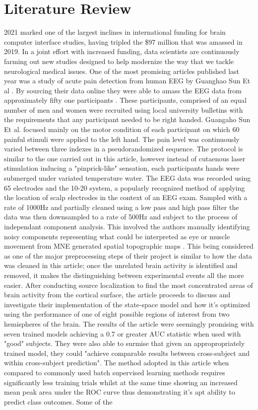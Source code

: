 \documentclass[11pt]{article}
\begin{document}
\section{Literature Review}

2021 marked one of the largest inclines in international funding for brain computer interface studies, having tripled the \$97 million that was amassed in 2019. In a joint effort with increased funding, data scientists are continuously farming out new studies designed to help modernize the way that we tackle neurological medical issues. One of the most promising articles published last year was a study of acute pain detection from human EEG by Guanghao Sun Et al \cite{SUN2021108964}. By sourcing their data online they were able to amass the EEG data from approximately fifty one participants \cite{Tiemann2018-sm}. These participants, comprised of an equal number of men and women were recruited using local university bulletins with the requirements that any participant needed to be right handed. Guangaho Sun Et al. focused mainly on the motor condition of each participant on which 60 painful stimuli were applied to the left hand. The pain level was continuously varied between three indexes in a pseudorandomized sequence. The protocol is similar to the one carried out in this article, however instead of cutaenous laser stimulation inducing a "pinprick-like" sensation, each participants hands were submerged under variated temperature water. The EEG data was recorded using 65 electrodes and the 10-20 system, a popularly recognized method of applying the location of scalp electrodes in the context of an EEG exam. Sampled with a rate of 1000Hz and partially cleaned using a low pass and high pass filter the data was then downsampled to a rate of 500Hz and subject to the process of independant component analysis. This involved the authors manually identifying noisy components representing what could be interpreted as eye or muscle movement from MNE generated spatial topographic maps \cite{GramfortEtAl2013a}. This being considered as one of the major preprocessing steps of their project is similar to how the data was cleaned in this article; once the unrelated brain activity is identified and removed, it makes the distinguishing between experimental events all the more easier. After conducting source localization to find the most concentrated areas of brain activity from the cortical surface, the article proceeds to discuss and investigate their implementation of the state-space model and how it's optimized using the performance of one of eight possible regions of interest from two hemispheres of the brain. The results of the article were seemingly promising with seven trained models achieving a 0.7 or greater AUC statistic when used with "good" subjects. They were also able to surmise that given an appropropriately trained model, they could "achieve comparable results between cross-subject and within cross-subject prediction". The method adopted in this article when compared to commonly used batch supervised learning methods requires significantly less training trials whilst at the same time showing an increased mean peak area under the ROC curve thus demonstrating it's apt ability to predict class outcomes. Some of the 
\end{document}
